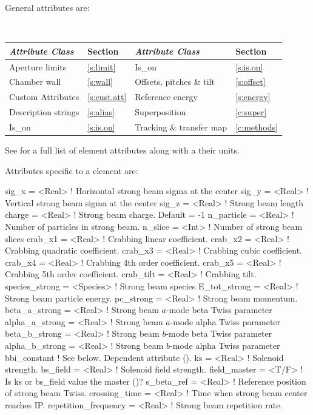 General  attributes are:
\begin{center} 
\tt
\begin{tabular}{llll} \toprule
  {\sl Attribute Class}      & Section          & {\sl Attribute Class}      & Section         \\ \midrule
  Aperture limits            & \ref{s:limit}    & Is_on                      & \ref{s:is.on}   \\
  Chamber wall               & \ref{s:wall}     & Offsets, pitches \& tilt   & \ref{s:offset}  \\
  Custom Attributes          & \ref{s:cust.att} & Reference energy           & \ref{s:energy}  \\
  Description strings        & \ref{s:alias}    & Superposition              & \ref{c:super}   \\
  Is_on                      & \ref{s:is.on}    & Tracking \& transfer map   & \ref{c:methods} \\ 
  \bottomrule
\end{tabular}
\end{center}
\toffset
See  for a full list of element attributes along with a their units.

Attributes specific to a  element are:
\begin{example}
  sig_x          = <Real>    ! Horizontal strong beam sigma at the center 
  sig_y          = <Real>    ! Vertical strong beam sigma at the center
  sig_z          = <Real>    ! Strong beam length
  charge         = <Real>    ! Strong beam charge. Default = -1
  n_particle     = <Real>    ! Number of particles in strong beam.
  n_slice        = <Int>     ! Number of strong beam slices
  crab_x1        = <Real>    ! Crabbing linear coefficient.
  crab_x2        = <Real>    ! Crabbing quadratic coefficient.
  crab_x3        = <Real>    ! Crabbing cubic coefficient.
  crab_x4        = <Real>    ! Crabbing 4th order coefficient.
  crab_x5        = <Real>    ! Crabbing 5th order coefficient.
  crab_tilt      = <Real>    ! Crabbing tilt.
  species_strong = <Species> ! Strong beam species
  E_tot_strong   = <Real>    ! Strong beam particle energy.
  pc_strong      = <Real>    ! Strong beam momentum.
  beta_a_strong  = <Real>    ! Strong beam $a$-mode beta Twiss parameter
  alpha_a_strong = <Real>    ! Strong beam $a$-mode alpha Twiss parameter 
  beta_b_strong  = <Real>    ! Strong beam $b$-mode beta Twiss parameter
  alpha_b_strong = <Real>    ! Strong beam $b$-mode alpha Twiss parameter
  bbi_constant               ! See below. Dependent attribute ().
  ks             = <Real>    ! Solenoid strength.
  bs_field       = <Real>    ! Solenoid field strength.
  field_master   = <T/F>     ! Is ks or bs_field value the master ()?
  s_beta_ref     = <Real>    ! Reference position of strong beam Twiss.
  crossing_time  = <Real>    ! Time when strong beam center reaches IP.
  repetition_frequency = <Real>  ! Strong beam repetition rate.
\end{example}

